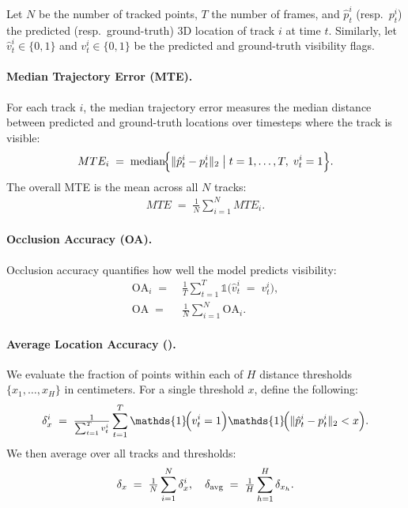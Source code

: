 Let $N$ be the number of tracked points, $T$ the number of frames, and $\hat{p}_t^i$ (resp.\ $p_t^i$) the predicted (resp.\ ground-truth) 3D location of track $i$ at time $t$. Similarly, let $\hat{v}_t^i\in\{0,1\}$ and $v_t^i\in\{0,1\}$ be the predicted and ground-truth visibility flags.

\paragraph{Median Trajectory Error (MTE).}
For each track $i$, the median trajectory error measures the median distance between predicted and ground-truth locations over timesteps where the track is visible:
\begin{align}
  MTE_i \;=\; \mathrm{median}\!\Bigl\{\|\hat{p}_t^i - p_t^i\|_2 \;\big|\; t=1,\dots,T,\;v_t^i=1\Bigr\}.
\end{align}
The overall MTE is the mean across all $N$ tracks:
\begin{align}
  MTE \;=\; \tfrac{1}{N}\sum_{i=1}^N MTE_i.
\end{align}

\paragraph{Occlusion Accuracy (OA).}
Occlusion accuracy quantifies how well the model predicts visibility:
\begin{align}
  \mathrm{OA}_i \;=\;& \tfrac{1}{T}\!\sum_{t=1}^T \mathds{1}\!\bigl(\hat{v}_t^i \;=\; v_t^i\bigr),\\
  \mathrm{OA} \;=\;& \tfrac{1}{N}\sum_{i=1}^N \mathrm{OA}_i.
\end{align}

\paragraph{Average Location Accuracy (\texorpdfstring{\davg}{davg}).}
We evaluate the fraction of points within each of $H$ distance thresholds $\{x_1,\dots,x_H\}$ in centimeters. For a single threshold $x$, define the following:
\begin{align}
  \delta_x^i
  \;=\;
  \tfrac{1}{\sum_{t=1}^T v_t^i}
  \sum_{t=1}^T
  \mathds{1}\!\Bigl(v_t^i=1\Bigr)
  \mathds{1}\!\Bigl(\|\hat{p}_t^i - p_t^i\|_2 < x\Bigr)
  .
\end{align}
We then average over all tracks and thresholds:
\begin{align}
  \delta_x
  \;=\;
  \tfrac{1}{N}\sum_{i=1}^N \delta_x^i,
  \quad
  \delta_\text{avg}
  \;=\;
  \tfrac{1}{H}\sum_{h=1}^H \delta_{x_h}.
\end{align}

